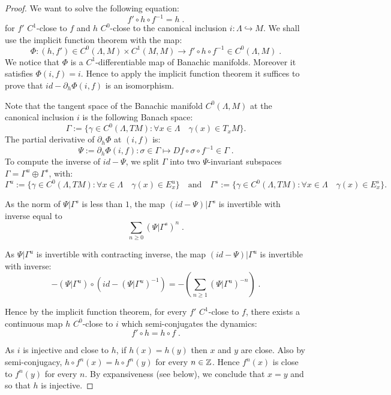 \documentclass[11pt,openany,leqno]{article}
\begin{document}
\begin{proof} 
We want to solve the following equation:
\begin{equation}\tag{$\star$} f'\circ h\circ f^{-1} =  h \; .
\end{equation}
for $f'$ $C^1$-close to $f$ and $h$ $C^0$-close to the canonical inclusion $i\colon \Lambda\hookrightarrow M$. We shall use the implicit function theorem with the map:
$$\Phi \colon (h, f')\in C^0(\Lambda,M)\times C^1(M,M) \to 
f'\circ h\circ f^{-1}  \in C^0(\Lambda,M)\; .$$
We notice that $\Phi$ is a $C^1$-differentiable map of Banachic manifolds. Moreover it satisfies $\Phi(i,f)=i$.  
Hence to apply the implicit function theorem it suffices to prove that $id- \partial_h  \Phi(i,f)$ is an isomorphism.

Note that  the tangent space of the Banachic manifold $C^0(\Lambda,M)$ at the canonical inclusion $i$ is the following Banach space:
\[\Gamma := \{ \gamma \in C^0(\Lambda, TM): \forall x \in \Lambda\quad \gamma (x) \in T_{x} M\}.\]
The partial derivative of $\partial_h \Phi$ at $(i,f)$ is: 
$$\Psi:=\partial_h \Phi (i, f)\colon \sigma \in \Gamma\mapsto 
Df \circ  \sigma\circ f^{-1} \in \Gamma\; .$$
To compute the inverse of $id-\Psi$, we split $\Gamma $ into two $\Psi$-invariant subspaces $\Gamma = \Gamma^{u}\oplus\Gamma^{s}$, with:
\[\Gamma^{u}:= \{ \gamma \in C^0(\Lambda, TM): \forall x \in \Lambda\quad \gamma (x) \in E^{u}_x\}\quad \text{and}\quad \Gamma^{s}:= \{ \gamma \in C^0(\Lambda, TM): \forall x \in \Lambda\quad \gamma (x) \in E^{s}_x\}.\]

As the norm of $\Psi|\Gamma^{s}$ is less than $1$,  the map $(id-\Psi)|\Gamma^{s}$ is invertible with inverse equal to  $$\sum_{n\ge 0} (\Psi|\Gamma^{s})^n\; .$$ 

As $\Psi|\Gamma^{u}$ is invertible with contracting inverse, the map $(id-\Psi)|\Gamma^{u}$ is invertible with inverse: 
$$ -(\Psi|\Gamma^{u})\circ  (id-(\Psi|\Gamma^{u})^{-1})= - (\sum_{n\ge 1} (\Psi|\Gamma^{u})^{-n})\; .$$

Hence by the implicit function theorem, for every $f'$ $C^1$-close to $f$, there exists a continuous map $h$ $C^0$-close to $i$ which semi-conjugates the dynamics:
$$ f'\circ h = h \circ f \; .$$

As $i$ is injective and close to $h$, if $h(x)= h(y)$ then $x$ and $y$ are close. Also by semi-conjugacy, $h \circ f^n(x)= h\circ f^n(y)$ for every $n\in \mathbb Z$. Hence $f^n(x)$ is close to $f^n(y)$ for every $n$. 
By expansiveness (see below), we conclude that $x=y$ and so that $h$ is injective.
\end{proof}
\end{document}
